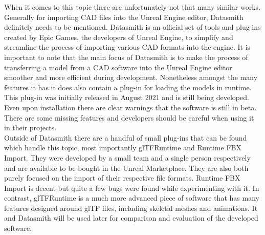 When it comes to this topic there are unfortunately not that many similar works. Generally for importing \acs{CAD} files into the Unreal Engine editor, Datasmith definitely needs to be mentioned. Datasmith is an official set of tools and plug-ins created by Epic Games, the developers of Unreal Engine, to simplify and streamline the process of importing various \acs{CAD} formats into the engine\cite{bib:DSDoc}. It is important to note that the main focus of Datasmith is to make the process of transferring a model from a \acs{CAD} software into the Unreal Engine editor smoother and more efficient during development. Nonetheless amongst the many features it has it does also contain a plug-in for loading the models in runtime\cite{bib:DSRunDoc}. This plug-in was initially released in August 2021 and is still being developed. Even upon installation there are clear warnings that the software is still in beta. There are some missing features and developers should be careful when using it in their projects.\\
Outside of Datasmith there are a handful of small plug-ins that can be found which handle this topic, most importantly glTFRuntime\cite{bib:glTFRun} and Runtime FBX Import\cite{bib:FBXRun}. They were developed by a small team and a single person respectively and are available to be bought in the Unreal Marketplace. They are also both purely focused on the import of their respective file formats. Runtime \acs{FBX} Import is decent but quite a few bugs were found while experimenting with it. In contrast, glTFRuntime is a much more advanced piece of software that has many features designed around \acs{glTF} files, including skeletal meshes and animations. It and Datasmith will be used later for comparison and evaluation of the developed software.